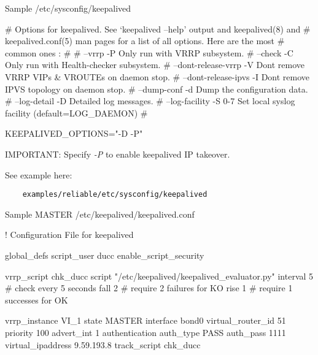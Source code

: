 \begin{minipage}{\textwidth}

	Sample /etc/sysconfig/keepalived

	\begin{greybatim}
	
# Options for keepalived. See `keepalived --help' output and keepalived(8) and
# keepalived.conf(5) man pages for a list of all options. Here are the most
# common ones :
#
# --vrrp               -P    Only run with VRRP subsystem.
# --check              -C    Only run with Health-checker subsystem.
# --dont-release-vrrp  -V    Dont remove VRRP VIPs & VROUTEs on daemon stop.
# --dont-release-ipvs  -I    Dont remove IPVS topology on daemon stop.
# --dump-conf          -d    Dump the configuration data.
# --log-detail         -D    Detailed log messages.
# --log-facility       -S    0-7 Set local syslog facility (default=LOG_DAEMON)
#

KEEPALIVED_OPTIONS="-D -P"

	\end{greybatim}
	
	\medskip
	IMPORTANT: Specify {\em -P} to enable keepalived IP takeover.
	
	\medskip
	See example here:
	\begin{verbatim}
    examples/reliable/etc/sysconfig/keepalived
   	\end{verbatim}
	
\end{minipage}

\begin{minipage}{\textwidth}

	Sample MASTER /etc/keepalived/keepalived.conf
	
	\begin{greybatim}
	
! Configuration File for keepalived

global_defs {
	script_user ducc 
	enable_script_security
}

vrrp_script chk_ducc {
  script       "/etc/keepalived/keepalived_evaluator.py"
  interval 5   # check every 5 seconds
  fall 2       # require 2 failures for KO
  rise 1       # require 1 successes for OK
}

vrrp_instance VI_1 {
    state MASTER
    interface bond0
    virtual_router_id 51
    priority 100
    advert_int 1
    authentication {
        auth_type PASS
        auth_pass 1111
    }
    virtual_ipaddress {
        9.59.193.8
    }
    track_script {
    	chk_ducc
  	}
}

   	\end{greybatim}

\end{minipage}

